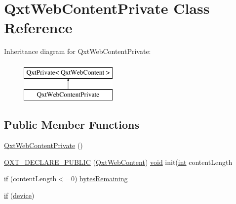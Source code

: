 \hypertarget{class_qxt_web_content_private}{\section{Qxt\-Web\-Content\-Private Class Reference}
\label{class_qxt_web_content_private}
}
Inheritance diagram for Qxt\-Web\-Content\-Private\-:\begin{figure}[H]
\begin{center}
\leavevmode
\includegraphics[height=2.000000cm]{class_qxt_web_content_private}
\end{center}
\end{figure}
\subsection*{Public Member Functions}
\begin{DoxyCompactItemize}
\item 
\hyperlink{class_qxt_web_content_private_a7fb457cbd989fd4e1728e8591e3b76df}{Qxt\-Web\-Content\-Private} ()
\item 
\hyperlink{class_qxt_web_content_private_a0c3beae3aa688c7a071561b8d1b287a9}{Q\-X\-T\-\_\-\-D\-E\-C\-L\-A\-R\-E\-\_\-\-P\-U\-B\-L\-I\-C} (\hyperlink{class_qxt_web_content}{Qxt\-Web\-Content}) \hyperlink{group___u_a_v_objects_plugin_ga444cf2ff3f0ecbe028adce838d373f5c}{void} init(\hyperlink{ioapi_8h_a787fa3cf048117ba7123753c1e74fcd6}{int} content\-Length
\item 
\hyperlink{class_qxt_web_content_private_a3bc584bba0056d5aa407ef50db58e030}{if} (content\-Length$<$=0) \hyperlink{class_qxt_web_content_private_ade9b1a15db3ab579e66da79618b3195a}{bytes\-Remaining}
\item 
\hyperlink{class_qxt_web_content_private_ae85eb449b1b3157cb8583b6be5de08d7}{if} (\hyperlink{class_qxt_web_content_private_a77782ebb89b1d603985a8e8ce05e4e2d}{device})
\end{DoxyCompactItemize}
